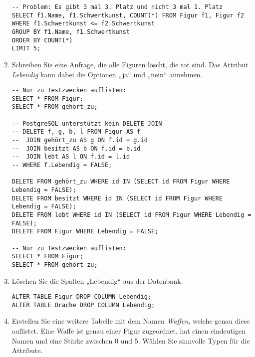 \documentclass{bschlangaul-aufgabe}
\begin{document}
\begin{enumerate}
\begin{liAntwort}
\begin{verbatim}
-- Problem: Es gibt 3 mal 3. Platz und nicht 3 mal 1. Platz
SELECT f1.Name, f1.Schwertkunst, COUNT(*) FROM Figur f1, Figur f2
WHERE f1.Schwertkunst <= f2.Schwertkunst
GROUP BY f1.Name, f1.Schwertkunst
ORDER BY COUNT(*)
LIMIT 5;
\end{verbatim}
\end{liAntwort}

%

\item Schreiben Sie eine Anfrage, die alle Figuren löscht, die tot sind.
Das Attribut \emph{Lebendig} kann dabei die Optionen „ja“ und „nein“
annehmen.

\begin{liAntwort}
\begin{verbatim}
-- Nur zu Testzwecken auflisten:
SELECT * FROM Figur;
SELECT * FROM gehört_zu;

-- PostgreSQL unterstützt kein DELETE JOIN
-- DELETE f, g, b, l FROM Figur AS f
--  JOIN gehört_zu AS g ON f.id = g.id
--  JOIN besitzt AS b ON f.id = b.id
--  JOIN lebt AS l ON f.id = l.id
-- WHERE f.Lebendig = FALSE;

DELETE FROM gehört_zu WHERE id IN (SELECT id FROM Figur WHERE Lebendig = FALSE);
DELETE FROM besitzt WHERE id IN (SELECT id FROM Figur WHERE Lebendig = FALSE);
DELETE FROM lebt WHERE id IN (SELECT id FROM Figur WHERE Lebendig = FALSE);
DELETE FROM Figur WHERE Lebendig = FALSE;

-- Nur zu Testzwecken auflisten:
SELECT * FROM Figur;
SELECT * FROM gehört_zu;
\end{verbatim}
\end{liAntwort}

%

\item Löschen Sie die Spalten „Lebendig“ aus der Datenbank.

\begin{liAntwort}
\begin{verbatim}
ALTER TABLE Figur DROP COLUMN Lebendig;
ALTER TABLE Drache DROP COLUMN Lebendig;
\end{verbatim}
\end{liAntwort}

%

\item Erstellen Sie eine weitere Tabelle mit dem Namen \emph{Waffen},
welche genau diese auflistet. Eine Waffe ist genau einer Figur
zugeordnet, hat einen eindeutigen Namen und eine Stärke zwischen 0 und
5. Wählen Sie sinnvolle Typen für die Attribute.


\end{enumerate}
\end{document}

